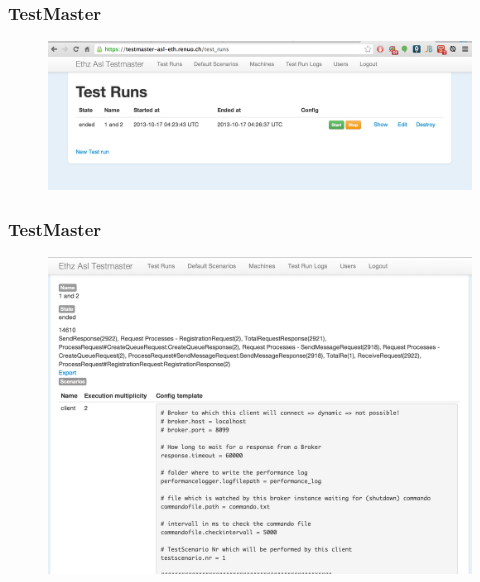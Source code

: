 \documentclass{beamer}
\begin{document}

\begin{frame}
\frametitle{TestMaster}
\begin{figure}
  \begin{center}
    \includegraphics[scale=0.3]{../../drawings/TestMaster03.png}
  \end{center}
  \label{fig:testsystem}
\end{figure}
\end{frame}



\begin{frame}
\frametitle{TestMaster}
\begin{figure}
  \begin{center}
    \includegraphics[scale=0.3]{../../drawings/TestMaster04.png}
  \end{center}
  \label{fig:testsystem}
\end{figure}
\end{frame}


\end{document}
